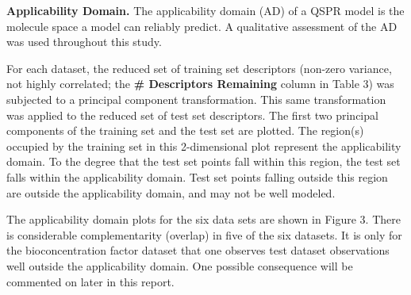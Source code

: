 \documentclass[10pt, letter]{article}
\renewcommand{\=}{\, =\, }
\newcommand{\+}{\, +\, }
\renewcommand{\-}{\, -\, }
\begin{document}
\textbf{Applicability Domain.} The applicability domain (AD) of a QSPR model is the molecule space a model can
reliably predict. A qualitative assessment of the AD was used throughout this study. 

For each dataset, the reduced set of training set descriptors (non-zero variance, not highly correlated; the \textbf{\# Descriptors Remaining} column in Table 3) was subjected to a principal component transformation. This same transformation was applied to the reduced set of test set descriptors. The first two principal components of the training set and the test set are plotted. The region(s) occupied by the training set in this 2-dimensional plot represent the applicability domain. To the degree that the test set points fall within this region, the test set falls within the applicability domain. Test set points falling outside this region are outside the applicability domain, and may not be well modeled.

The applicability domain plots for the six data sets are shown in Figure 3. There is considerable complementarity (overlap) in five of the six datasets. It is only for the bioconcentration factor dataset that one observes test dataset observations well outside the applicability domain. One possible consequence will be commented on later in this report.
\end{document}
